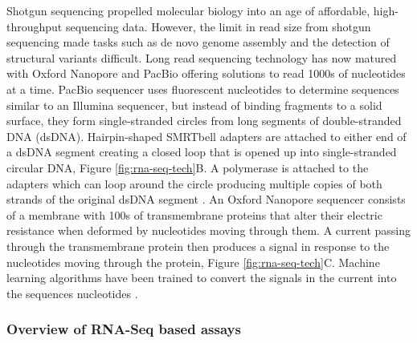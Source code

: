 \documentclass[../main.tex]{subfiles}
\begin{document}
Shotgun sequencing propelled molecular biology into an age of affordable, high-throughput sequencing data.
However, the limit in read size from shotgun sequencing made tasks such as de novo genome assembly and the detection of structural variants difficult.
Long read sequencing technology has now matured with Oxford Nanopore and PacBio offering solutions to read 1000s of nucleotides at a time. 
PacBio sequencer uses fluorescent nucleotides to determine sequences similar to an Illumina sequencer, but instead of binding fragments to a solid surface, they form single-stranded circles from long segments of double-stranded DNA (dsDNA).
Hairpin-shaped SMRTbell adapters are attached to either end of a dsDNA segment creating a closed loop that is opened up into single-stranded circular DNA, Figure \ref{fig:rna-seq-tech}B. 
A polymerase is attached to the adapters which can loop around the circle producing multiple copies of both strands of the original dsDNA segment \parencite{Hu2021}.
An Oxford Nanopore sequencer consists of a membrane with 100s of transmembrane proteins that alter their electric resistance when deformed by nucleotides moving through them.  
A current passing through the transmembrane protein then produces a signal in response to the nucleotides moving through the protein, Figure \ref{fig:rna-seq-tech}C.
Machine learning algorithms have been trained to convert the signals in the current into the sequences nucleotides \parencite{Jain2016}.

\subsubsection{Overview of RNA-Seq based assays}
\end{document}
